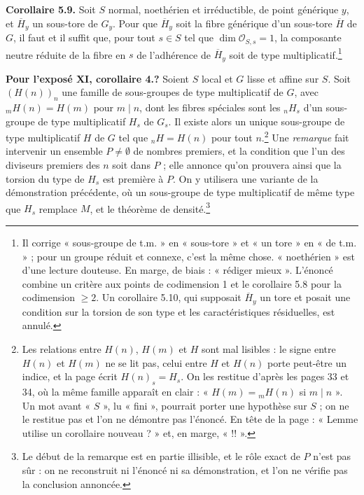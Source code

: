 \documentclass[11pt,a4paper]{article}
\begin{document}
\textbf{Corollaire 5.9.} Soit $S$ normal, noethérien et irréductible, de
point générique $y$, et
$\overline{H}_{y}$ un sous-tore de $G_{y}$. Pour que $\overline{H}_{y}$ soit la
fibre générique d'un sous-tore $\overline{H}$ de $G$, il faut et il suffit
que, pour tout $s \in S$ tel que $\dim \mathcal{O}_{S,s} = 1$, la composante
neutre réduite de la fibre en $s$ de l'adhérence de $\overline{H}_{y}$ soit de
type multiplicatif.\footnote{Il corrige « sous-groupe de t.m. » en
« sous-tore » et « un tore » en « de t.m. » ; pour un groupe réduit et
connexe, c'est la même chose. « noethérien » est d'une lecture douteuse. En
marge, de biais : « rédiger mieux ». L'énoncé combine un critère aux points
de codimension 1 et le corollaire 5.8 pour la codimension $\geqslant 2$. Un
corollaire 5.10, qui supposait $\overline{H}_{y}$ un tore et posait une
condition sur la torsion de son type et les caractéristiques résiduelles,
est annulé.}

\textbf{Pour l'exposé XI, corollaire 4.?} Soient $S$ local et $G$ lisse et
affine sur $S$. Soit $(H(n))_{n}$ une famille de sous-groupes de type
multiplicatif de $G$, avec ${}_{m}H(n) = H(m)$ pour $m \mid n$, dont les fibres
spéciales sont les ${}_{n}H_{s}$ d'un sous-groupe de type multiplicatif $H_{s}$
de $G_{s}$. Il existe alors un unique sous-groupe de type multiplicatif $H$ de
$G$ tel que ${}_{n}H = H(n)$ pour tout $n$.\footnote{Les relations entre
$H(n)$, $H(m)$ et $H$ sont mal lisibles : le signe entre $H(n)$ et $H(m)$ ne
se lit pas, celui entre $H$ et $H(n)$ porte peut-être un indice, et la page
écrit $H(n)_{s} = H_{s}$. On les restitue d'après les pages 33 et 34, où la
même famille apparaît en clair : « $H(m) = {}_{m}H(n)$ si $m \mid n$ ». Un mot
avant « $S$ », lu « fini », pourrait porter une hypothèse sur $S$ ; on ne le
restitue pas et l'on ne démontre pas l'énoncé. En tête de la page : « Lemme
utilise un corollaire nouveau ? » et, en marge, « !! ».} Une
\emph{remarque} fait intervenir un ensemble $P \neq \emptyset$ de nombres
premiers, et la condition que l'un des diviseurs premiers des $n$ soit dans
$P$ ; elle annonce qu'on prouvera ainsi que la torsion du type de $H_{s}$ est
première à $P$. On y utilisera une variante de la démonstration précédente,
où un sous-groupe de type multiplicatif de même type que $H_{s}$ remplace
$M$, et le théorème de densité.\footnote{Le début de la remarque est en
partie illisible, et le rôle exact de $P$ n'est pas sûr : on ne reconstruit
ni l'énoncé ni sa démonstration, et l'on ne vérifie pas la conclusion
annoncée.}
\end{document}
